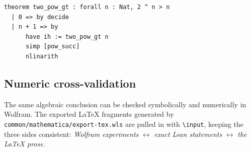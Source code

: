 \begin{lstlisting}
theorem two_pow_gt : forall n : Nat, 2 ^ n > n
  | 0 => by decide
  | n + 1 => by
      have ih := two_pow_gt n
      simp [pow_succ]
      nlinarith
\end{lstlisting}

\subsection{Numeric cross-validation}
The same algebraic conclusion can be checked symbolically and numerically in
Wolfram. The exported \LaTeX{} fragments generated by
\texttt{common/mathematica/export-tex.wls} are pulled in with
\texttt{\textbackslash input}, keeping the three sides consistent:
\emph{Wolfram experiments} $\leftrightarrow$ \emph{exact Lean statements}
$\leftrightarrow$ \emph{the LaTeX prose}.
